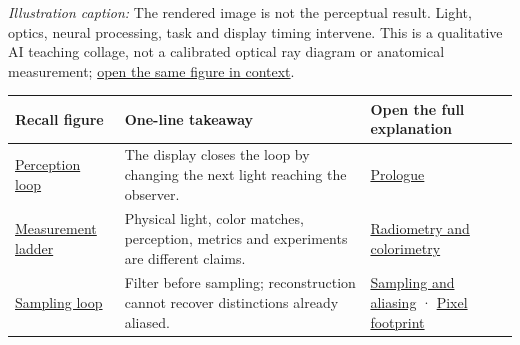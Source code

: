 \emph{Illustration caption:} The rendered image is not the perceptual result. Light, optics, neural processing, task and display timing intervene. This is a qualitative AI teaching collage, not a calibrated optical ray diagram or anatomical measurement; \href{Continuous\%20Notes/University\%20-\%20Worlds,\%20Images\%20and\%20Inference\%20-\%20Graphics,\%20Vision\%20and\%20Photography\#Figure\%20X0\%20—\%20A\%20qualitative\%20picture\%20of\%20the\%20XR\%20loop}{open the same figure in context}.

{\def\LTcaptype{none} %
\begin{longtable}[]{@{}
  >{\raggedright\arraybackslash}p{}
  >{\raggedright\arraybackslash}p{}
  >{\raggedright\arraybackslash}p{}@{}}
\toprule\noalign{}
\begin{minipage}[b]{\linewidth}\raggedright
Recall figure
\end{minipage} & \begin{minipage}[b]{\linewidth}\raggedright
One-line takeaway
\end{minipage} & \begin{minipage}[b]{\linewidth}\raggedright
Open the full explanation
\end{minipage} \\
\midrule\noalign{}
\endhead
\bottomrule\noalign{}
\endlastfoot
\hyperref[appendix-73c6b8ed5a87-from-emitted-light-to-a-perceptual-claim]{Perception loop} & The display closes the loop by changing the next light reaching the observer. & \href{Continuous\%20Notes/University\%20-\%20Worlds,\%20Images\%20and\%20Inference\%20-\%20Graphics,\%20Vision\%20and\%20Photography\#Prologue\%20-\%20A\%20perfect\%20scene\%20can\%20still\%20make\%20a\%20poor\%20experience/}{Prologue} \\
\hyperref[appendix-73c6b8ed5a87-four-measurement-families-that-must-not-be-collapsed]{Measurement ladder} & Physical light, color matches, perception, metrics and experiments are different claims. & \href{Continuous\%20Notes/University\%20-\%20Worlds,\%20Images\%20and\%20Inference\%20-\%20Graphics,\%20Vision\%20and\%20Photography\#Light\%20must\%20become\%20a\%20quantity\%20before\%20it\%20becomes\%20a\%20color/}{Radiometry and colorimetry} \\
\hyperref[appendix-73c6b8ed5a87-sampling-and-filtering-preserve-what-can-be-distinguished]{Sampling loop} & Filter before sampling; reconstruction cannot recover distinctions already aliased. & \href{Continuous\%20Notes/University\%20-\%20Worlds,\%20Images\%20and\%20Inference\%20-\%20Graphics,\%20Vision\%20and\%20Photography\#Sampling\%20is\%20a\%20question\%20of\%20what\%20remains\%20distinguishable/}{Sampling and aliasing} · \href{Continuous\%20Notes/University\%20-\%20Worlds,\%20Images\%20and\%20Inference\%20-\%20Graphics,\%20Vision\%20and\%20Photography\#A\%20footprint\%20is\%20more\%20meaningful\%20than\%20an\%20isolated\%20pixel\%20center/}{Pixel footprint} \\

\end{longtable}}
